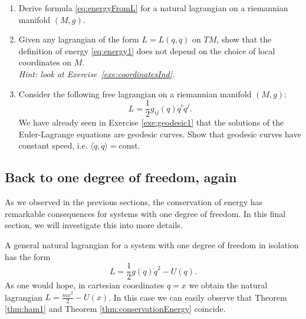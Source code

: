 \documentclass[english,fontsize=11pt,paper=a5,oneside]{scrbook}
\newcommand{\lag}{\langle}
\newcommand{\rag}{\rangle}
\let\d\relax
\DeclareMathOperator{\d}{d}
\theoremstyle{definition}
\newenvironment{exercise}
  {\pushQED{\qed}\renewcommand{\qedsymbol}{$\maltese$}\exercisex}
  {\popQED\endexercisex}
\begin{document}
\begin{exercise}
    \begin{enumerate}
        \item Derive formula \eqref{eq:energyFromL} for a natural lagrangian on a riemannian manifold $(M,g)$.
        \item Given any lagrangian of the form $L = L(q, \dot q)$ on $TM$, show that the definition of energy \eqref{eq:energy1} does not depend on the choice of local coordinates on $M$.\\\textit{Hint: look at Exercise~\ref{exe:coordinatesInd}.}
        \item Consider the following free lagrangian on a riemannian manifold $(M, g)$:
        \begin{equation}
            L = \frac12 g_{ij}(q)\dot q^i \dot q^j.
        \end{equation}
        We have already seen in Exercise \ref{exe:geodesic1} that the solutions of the Euler-Lagrange equations are geodesic curves.
        Show that geodesic curves have constant speed, i.e. $\lag\dot q, \dot q\rag = \mathrm{const}$.
    \end{enumerate}
\end{exercise}




\subsection{Back to one degree of freedom, again}\label{sec:1deg-again}

As we observed in the previous sections, the conservation of energy has remarkable consequences for systems with one degree of freedom.
In this final section, we will investigate this into more details.

A general natural lagrangian for a system with one degree of freedom in isolation has the form
\begin{equation}
    L = \frac12 g(q)\dot q^2 - U(q).
\end{equation}
As one would hope, in cartesian coordinates $q = x$ we obtain the natural lagrangian $L = \frac{m \dot x^2}{2} - U(x)$.
In this case we can easily observe that Theorem \ref{thm:ham1} and Theorem \ref{thm:conservationEnergy} coincide.
\end{document}
